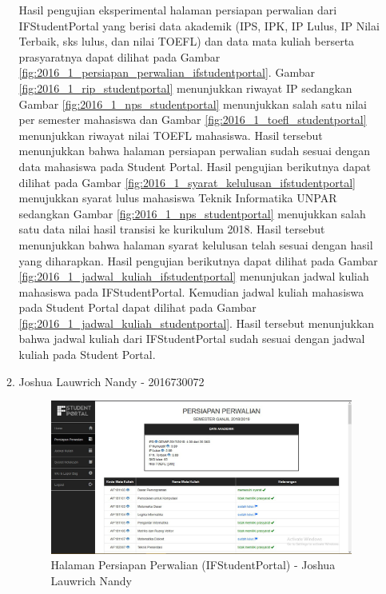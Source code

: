\begin{itemize}
\begin{enumerate}
		Hasil pengujian eksperimental halaman persiapan perwalian dari IFStudentPortal yang berisi data akademik (IPS, IPK, IP Lulus, IP Nilai Terbaik, sks lulus, dan nilai TOEFL) dan data mata kuliah berserta prasyaratnya dapat dilihat pada Gambar \ref{fig:2016_1_persiapan_perwalian_ifstudentportal}. Gambar \ref{fig:2016_1_rip_studentportal} menunjukkan riwayat IP sedangkan Gambar \ref{fig:2016_1_nps_studentportal} menunjukkan salah satu nilai per semester mahasiswa dan Gambar \ref{fig:2016_1_toefl_studentportal} menunjukkan riwayat nilai TOEFL mahasiswa. Hasil tersebut menunjukkan bahwa halaman persiapan perwalian sudah sesuai dengan data mahasiswa pada Student Portal. Hasil pengujian berikutnya dapat dilihat pada Gambar \ref{fig:2016_1_syarat_kelulusan_ifstudentportal} menujukkan syarat lulus mahasiswa Teknik Informatika UNPAR sedangkan Gambar \ref{fig:2016_1_nps_studentportal} menujukkan salah satu data nilai hasil transisi ke kurikulum 2018. Hasil tersebut menunjukkan bahwa halaman syarat kelulusan telah sesuai dengan hasil yang diharapkan. Hasil pengujian berikutnya dapat dilihat pada Gambar \ref{fig:2016_1_jadwal_kuliah_ifstudentportal} menunjukan jadwal kuliah mahasiswa pada IFStudentPortal. Kemudian jadwal kuliah mahasiswa pada Student Portal dapat dilihat pada Gambar \ref{fig:2016_1_jadwal_kuliah_studentportal}. Hasil tersebut menunjukkan bahwa jadwal kuliah dari IFStudentPortal sudah sesuai dengan jadwal kuliah pada Student Portal.
		\item Joshua Lauwrich Nandy - 2016730072 \\
		\begin{figure}[H]
			\centering
			\includegraphics[scale=0.45]{Gambar/HasilPengujian/2016_2_persiapan_perwalian_ifstudentportal}
			\caption{Halaman Persiapan Perwalian (IFStudentPortal) - Joshua Lauwrich Nandy}
			\label{fig:2016_2_persiapan_perwalian_ifstudentportal}
		\end{figure}

\end{enumerate}
\end{itemize}
